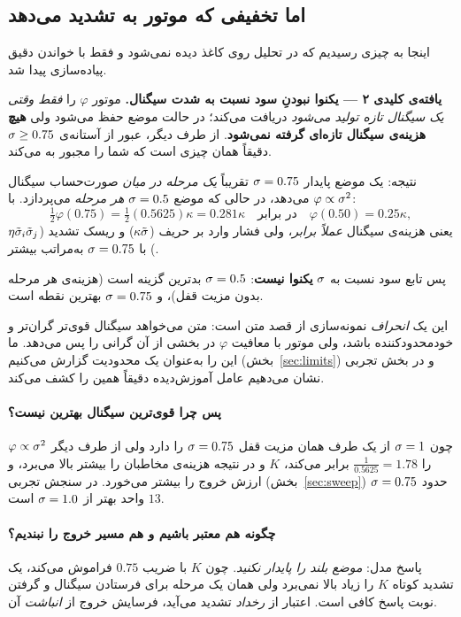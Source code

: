 \documentclass[12pt,a4paper]{article}
\begin{document}
\subsection{اما تخفیفی که موتور به تشدید می‌دهد}

اینجا به چیزی رسیدیم که در تحلیل روی کاغذ دیده نمی‌شود و فقط با خواندن دقیق
پیاده‌سازی پیدا شد.

\begin{findbox}
\textbf{یافته‌ی کلیدی ۲ — یکنوا نبودنِ سود نسبت به شدت سیگنال.}
موتور $\varphi$ را \emph{فقط وقتی یک سیگنال تازه تولید می‌شود} دریافت می‌کند؛
در حالت  موضع حفظ می‌شود ولی \textbf{هیچ هزینه‌ی سیگنال تازه‌ای گرفته
نمی‌شود}. از طرف دیگر، عبور از آستانه‌ی $\sigma\ge0.75$ دقیقاً همان چیزی است که
شما را مجبور به  می‌کند.

نتیجه: یک موضع پایدار $\sigma=0.75$ تقریباً \emph{یک مرحله در میان} صورت‌حساب
سیگنال می‌دهد، در حالی که موضع $\sigma=0.5$ \emph{هر مرحله} می‌پردازد. با
$\varphi\propto\sigma^2$:
\[
  \tfrac12\varphi(0.75)=\tfrac12(0.5625)\kappa=0.281\kappa
  \quad\text{در برابر}\quad
  \varphi(0.50)=0.25\kappa ,
\]
یعنی هزینه‌ی سیگنال \emph{عملاً برابر}، ولی فشار وارد بر حریف
($\kappa\tilde{\sigma}$) و ریسک تشدید ($\eta\tilde{\sigma}_i\tilde{\sigma}_j$) با
$\sigma=0.75$ به‌مراتب بیشتر.

پس تابع سود نسبت به $\sigma$ \textbf{یکنوا نیست}: $\sigma=0.5$ بدترین گزینه است
(هزینه‌ی هر مرحله بدون مزیت قفل)، و $\sigma=0.75$ بهترین نقطه است.
\end{findbox}

این یک \emph{انحراف} نمونه‌سازی از قصد متن است: متن می‌خواهد سیگنال قوی‌تر
گران‌تر و خودمحدودکننده باشد، ولی موتور با معافیت $\varphi$ در 
بخشی از آن گرانی را پس می‌دهد. ما این را به‌عنوان یک محدودیت گزارش می‌کنیم
(بخش~\ref{sec:limits}) و در بخش تجربی نشان می‌دهیم عامل آموزش‌دیده دقیقاً همین
را کشف می‌کند.

\paragraph{پس چرا قوی‌ترین سیگنال بهترین نیست؟}
چون $\sigma=1$ از یک طرف همان مزیت قفل $\sigma=0.75$ را دارد ولی از طرف دیگر
$\varphi\propto\sigma^2$ را $\tfrac{1}{0.5625}=1.78$ برابر می‌کند، $K$ و در
نتیجه هزینه‌ی مخاطبان را بیشتر بالا می‌برد، و ارزش خروج را بیشتر می‌خورد. در
سنجش تجربی (بخش~\ref{sec:sweep}) $\sigma=0.75$ حدود $13$ واحد بهتر از
$\sigma=1.0$ است.

\paragraph{چگونه هم معتبر باشیم و هم مسیر خروج را نبندیم؟}
پاسخ مدل: \emph{موضع بلند را پایدار نکنید}. چون $K$ با ضریب $0.75$ فراموش
می‌کند، یک تشدید کوتاه $K$ را زیاد بالا نمی‌برد ولی همان یک مرحله برای
فرستادن سیگنال و گرفتن نوبت پاسخ کافی است. اعتبار از \emph{رخداد} تشدید
می‌آید، فرسایش خروج از \emph{انباشت} آن.
\end{document}
